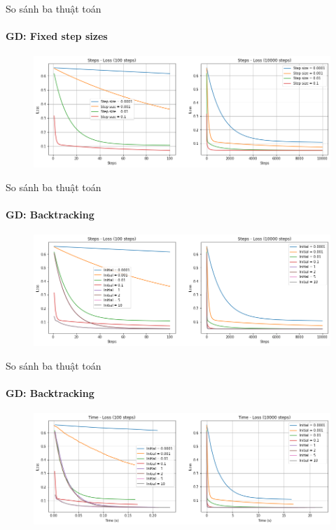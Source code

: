 \documentclass[10pt]{beamer}
\theoremstyle{remark}
\theoremstyle{definition}
\begin{document}
\begin{frame}{So sánh ba thuật toán}
	\framesubtitle{GD: Fixed step sizes}

	  \begin{figure}[h!]
		\centering
		\includegraphics[width=12cm]{Thinh/4.png}
	  \end{figure}
\end{frame}

\begin{frame}{So sánh ba thuật toán}
	\framesubtitle{GD: Backtracking}
	\begin{figure}[h!]
		\centering
		\includegraphics[width=12cm]{Thinh/5.png}
	\end{figure}

\end{frame}

\begin{frame}{So sánh ba thuật toán}
	\framesubtitle{GD: Backtracking}
	\begin{figure}[h!]
		\centering
		\includegraphics[width=12cm]{Thinh/6.png}
	\end{figure}
\end{frame}
\end{document}
